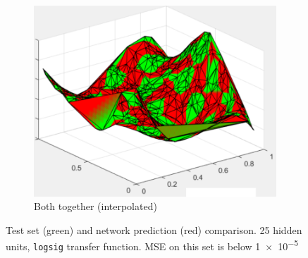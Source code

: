 \documentclass[a4paper, 10pt]{article}
\begin{document}
\begin{figure}[htb]
\begin{adjustwidth}{-1.1cm}{-1.1cm}
\begin{subfigure}[t]{0.29\linewidth}
      \includegraphics[width=1\linewidth]{./project/sim_and_test.png}
      \caption{Both together (interpolated)}
      \label{fig:underfit}
    \end{subfigure}
    \end{adjustwidth}
    \caption{Test set (green) and network prediction (red) comparison. 25 hidden units,
      \texttt{logsig} transfer function. MSE on this set is below \num{1e-5}}
    \label{fig:l5_regression_test}
  \end{figure}
\end{document}

